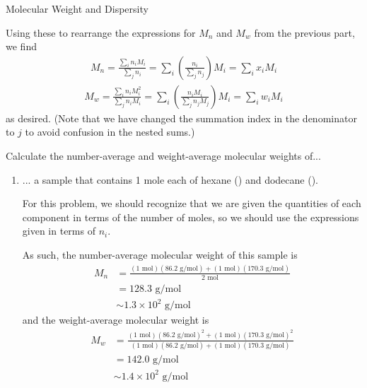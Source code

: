 \begin{activity}{Molecular Weight and Dispersity}
\begin{exercises}
\begin{enumerate}
\begin{solution}{}
						Using these to rearrange the expressions for $M_n$ and $M_w$ from the previous part, we find
	\begin{align*}
		M_n = \frac{\sum_i  n_i M_i}{\sum_j n_i}
			= \sum_i \left(\frac{n_i}{\sum_j n_j}\right) M_i
			= \sum_i x_i M_i
	\end{align*}
	\begin{align*}
		M_w = \frac{\sum_i n_i M_i^2 }{\sum_j n_i M_i}
			= \sum_i \left(\frac{n_i M_i}{\sum_j n_j M_j}\right) M_i
			= \sum_i w_i M_i
	\end{align*}
	as desired.  (Note that we have changed the summation index in the denominator to $j$ to avoid confusion in the nested sums.)
						
					\end{solution}
				
			\end{enumerate}
			
		\exercise Calculate the number-average and weight-average molecular weights of...
		
			\begin{enumerate}
			
				\item ... a sample that contains 1 mole each of hexane () and dodecane ().
					
					\begin{solution}{}
						For this problem, we should recognize that we are given the quantities of each component in terms of the number of moles, so we should use the expressions given in terms of $n_i$.
						
						As such, the number-average molecular weight of this sample is
						\begin{align*}
							M_n &= \frac{(1\text{ mol})(86.2\text{ g/mol})+(1\text{ mol})(170.3\text{ g/mol})}{2\text{ mol}} \\
								&= 128.3\text{ g/mol}\\
								&\sim 1.3\times 10^2\text{ g/mol}
						\end{align*}
						and the weight-average molecular weight is
						\begin{align*}
							M_w &= \frac{(1\text{ mol})(86.2\text{ g/mol})^2+(1\text{ mol})(170.3\text{ g/mol})^2}{(1\text{ mol})(86.2\text{ g/mol})+(1\text{ mol})(170.3\text{ g/mol})} \\
								&= 142.0\text{ g/mol}\\
								&\sim 1.4\times 10^2\text{ g/mol}
						\end{align*}
					\end{solution}
				

\end{enumerate}
\end{exercises}
\end{activity}

